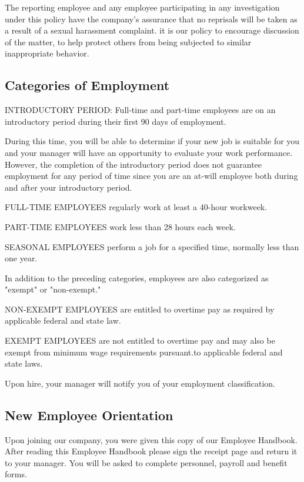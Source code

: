 The reporting employee and any employee participating in any investigation under this policy have the company's assurance that no reprisals will be taken as a result of a sexual harassment complaint. it is our policy to encourage discussion of the matter, to help protect others from being subjected to similar inappropriate behavior.

\subsection{Categories of Employment}

INTRODUCTORY PERIOD: Full-time and part-time employees are on an introductory period during their first 90 days of employment.

During this time, you will be able to determine if your new job is suitable for you and your manager will have an opportunity to evaluate your work performance. However, the completion of the introductory period does not guarantee employment for any period of time since you are an at-will employee both during and after your introductory period.

FULL-TIME EMPLOYEES regularly work at least a 40-hour workweek.

PART-TIME EMPLOYEES work less than 28 hours each week.

SEASONAL EMPLOYEES perform a job for a specified time, normally less than one year.

In addition to the preceding categories, employees are also categorized as "exempt" or "non-exempt."

NON-EXEMPT EMPLOYEES are entitled to overtime pay as required by applicable federal and state law.

EXEMPT EMPLOYEES are not entitled to overtime pay and may also be exempt from minimum wage requirements pursuant.to applicable federal and state laws.

Upon hire, your manager will notify you of your employment classification.

\subsection{New Employee Orientation}

Upon joining our company, you were given this copy of our Employee Handbook. After reading this Employee Handbook please sign the receipt page and return it to your manager. You will be asked to complete personnel, payroll and benefit forms.


